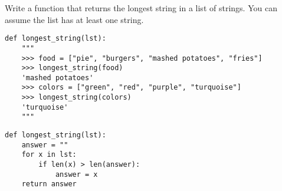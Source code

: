 \begin{blocksection}
\question Write a function that returns the longest string in a list of strings. You can assume the list has at least one string.

\begin{lstlisting}
def longest_string(lst):
    """
    >>> food = ["pie", "burgers", "mashed potatoes", "fries"]
    >>> longest_string(food)
    'mashed potatoes'
    >>> colors = ["green", "red", "purple", "turquoise"]
    >>> longest_string(colors)
    'turquoise'
    """

\end{lstlisting}

\begin{solution}[1.5in]
\begin{lstlisting}
def longest_string(lst):
    answer = ""
    for x in lst:
        if len(x) > len(answer):
            answer = x
    return answer
    
    
\end{lstlisting}
\end{solution}
\end{blocksection}
